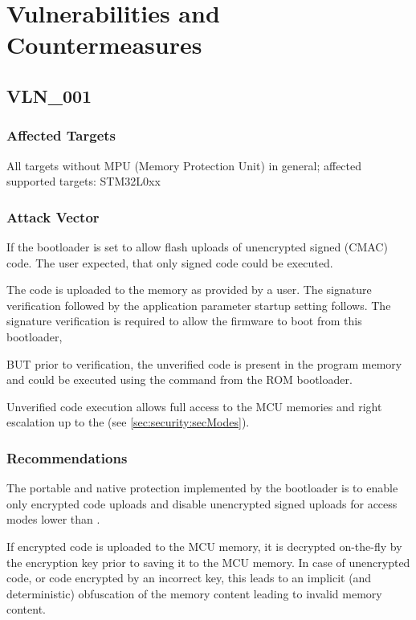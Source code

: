 \clearpage
\section{Vulnerabilities and Countermeasures}\label{sec:vln}

\subsection{VLN\_001}\label{sec:vln:001}

\subsubsection*{Affected Targets}
All targets without MPU (Memory Protection Unit) in general; affected supported targets: STM32L0xx

\subsubsection*{Attack Vector}
If the bootloader is set to allow flash uploads of unencrypted signed (CMAC) code.
The user expected, that only signed code could be executed.

The code is uploaded to the memory as provided by a user. The signature verification followed by the application parameter startup setting follows.
The signature verification is required to allow the firmware to boot from this bootloader,

BUT prior to verification, the unverified code is present in the program memory and could be executed using the  command from the ROM bootloader.

Unverified code execution allows full access to the MCU memories and right escalation up to the  (see \ref{sec:security:secModes}).

\subsubsection*{Recommendations}

The portable and native protection implemented by the bootloader is to enable only encrypted code uploads and disable unencrypted signed uploads
for access modes lower than .

If encrypted code is uploaded to the MCU memory, it is decrypted on-the-fly by the encryption key prior to saving it to the MCU memory.
In case of unencrypted code, or code encrypted by an incorrect key, this leads to an implicit (and deterministic) obfuscation
of the memory content leading to invalid memory content.

